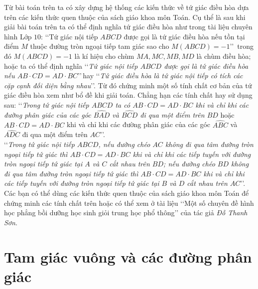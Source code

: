 \begin{bt}
\begin{nx}
Từ bài toán trên ta có xây dựng hệ thống các kiến thức về tứ giác điều hòa dựa trên các kiến thức quen thuộc của sách giáo khoa môn Toán. Cụ thể là sau khi giải bài toán trên ta có thể định nghĩa tứ giác điều hòa như trong tài liệu chuyên hình Lớp $10$: \lq\lq Tứ giác nội tiếp $ABCD$ được gọi là tứ giác điều hòa nếu tồn tại điểm $M$ thuộc đường tròn ngoại tiếp tam giác sao cho $M(ABCD)=-1$\rq\rq\, trong đó $M(ABCD)=-1$ là kí hiệu cho chùm $MA, MC, MB, MD$ là chùm điều hòa; hoặc ta có thể định nghĩa \lq\lq \textit{Tứ giác nội tiếp $ABCD$ được gọi là tứ giác điều hòa nếu $AB\cdot CD=AD\cdot BC$}\rq\rq\,hay \lq\lq \textit{Tứ giác  điều hòa là tứ giác nội tiếp có tích các cặp cạnh đối diện bằng nhau}\rq\rq. Từ đó chứng minh một số tính chất cơ bản của tứ giác điều hòa xem như bổ đề khi giải toán. Chẳng hạn các tính chất hay sử dụng sau: \lq\lq \textit{Trong tứ giác nội tiếp $ABCD$ ta có $AB\cdot CD=AD\cdot BC$ khi và chỉ khi các đường phân giác của các góc $\widehat{BAD}$ và $\widehat{BCD}$ đi qua một điểm trên $BD$} hoặc $AB\cdot CD=AD\cdot BC$ khi và chỉ khi các đường phân giác của các góc $\widehat{ABC}$ và $\widehat{ADC}$ đi qua một điểm trên $AC$\rq\rq.\\
\lq\lq \textit{Trong tứ giác nội tiếp $ABCD$,  nếu đường chéo $AC$ không đi qua tâm đường tròn ngoại tiếp tứ giác thì $AB\cdot CD=AD\cdot BC$ khi và chỉ khi các tiếp tuyến với đường tròn ngoại tiếp tứ giác tại $A$ và $C$ cắt nhau trên $BD$; nếu đường chéo $BD$ không đi qua tâm đường tròn ngoại tiếp tứ giác thì $AB\cdot CD=AD\cdot BC$ khi và chỉ khi các tiếp tuyến với đường tròn ngoại tiếp tứ giác tại $B$ và $D$ cắt nhau trên $AC$}\rq\rq. Các bạn có thể dùng các kiến thức quen thuộc của sách giáo khoa môn Toán để chứng minh các tính chất trên hoặc có thể xem ở tài liệu \lq\lq Một số chuyên đề hình học phẳng bồi dưỡng học sinh giỏi trung học phổ thông\rq\rq\; của tác giả \textit{Đỗ Thanh Sơn}. 
\end{nx}  
\end{bt}


\setcounter{bt}{0}
\section{Tam giác vuông và các đường phân giác}
\begin{center}
\textbf{\color{violet}{Vũ Hữu Bình, Hà Nội}}
\end{center}
